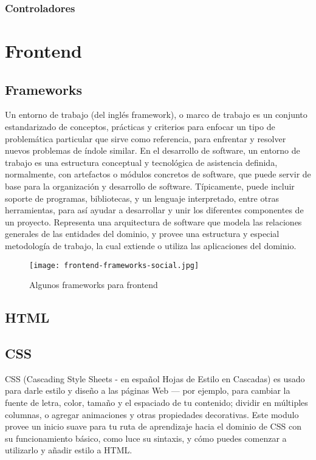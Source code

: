 \subsubsection{Controladores}

\section{Frontend}
\subsection{Frameworks}

\cite{wiki}Un entorno de trabajo (del inglés framework), o marco de trabajo es un conjunto estandarizado
de conceptos, prácticas y criterios para enfocar un tipo de problemática particular que sirve como
referencia, para enfrentar y resolver nuevos problemas de índole similar.
En el desarrollo de software, un entorno de trabajo es una estructura conceptual y tecnológica
de asistencia definida, normalmente, con artefactos o módulos concretos de software, que puede
servir de base para la organización y desarrollo de software. Típicamente, puede incluir soporte
de programas, bibliotecas, y un lenguaje interpretado, entre otras herramientas, para así ayudar a
desarrollar y unir los diferentes componentes de un proyecto.
Representa una arquitectura de software que modela las relaciones generales de las entidades del
dominio, y provee una estructura y especial metodología de trabajo, la cual extiende o utiliza las
aplicaciones del dominio.

\begin{figure}[H]
	\center
	\texttt{[image: frontend-frameworks-social.jpg]}
	\caption{Algunos frameworks para frontend}
	\label{fig:super}
\end{figure}

\subsection{HTML}


\subsection{CSS}

\cite{mdn}CSS (Cascading Style Sheets - en español Hojas de Estilo en Cascadas) es usado para darle estilo y diseño a las páginas Web — por ejemplo, para cambiar la fuente de letra, color, tamaño y el espaciado de tu contenido; dividir en múltiples columnas, o agregar animaciones y otras propiedades decorativas. Este modulo provee un inicio suave para tu ruta de aprendizaje hacia el dominio de CSS con su funcionamiento básico, como luce su sintaxis, y cómo puedes comenzar a utilizarlo y añadir estilo a HTML.

